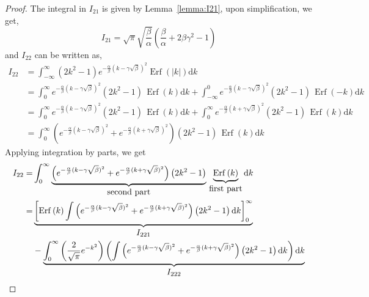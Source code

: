 \documentclass[journal]{IEEEtran}
\theoremstyle{plain}
\theoremstyle{definition}
\theoremstyle{remark}
\newcommand{\Erf}{\operatorname{Erf}}
\newcommand{\dd}{\mathrm{d}}
\begin{document}
\begin{proof}
The integral in $I_{21}$ is given by Lemma~\ref{lemma:I21}, upon simplification, we get,
\begin{equation}
    I_{21} = \sqrt{\pi} \sqrt{\frac{\beta}{\alpha}} \left(\frac{\beta}{\alpha} + 2 \beta \gamma^2 - 1 \right)
\end{equation}
and $I_{22}$ can be written as,
\begin{equation}
\begin{split}
    I_{22} &= \int_{-\infty}^\infty \left(2 k^2 - 1\right) e^{ -\frac{\alpha}{\beta} (k - \gamma\sqrt{\beta})^{2} } \Erf\left(|k|\right) \dd k \\
    &= \int_{0}^\infty e^{ -\frac{\alpha}{\beta} (k - \gamma\sqrt{\beta})^{2} } \left(2 k^2 - 1\right)\, \Erf\left(k\right) \dd k + \int_{-\infty}^0 e^{ -\frac{\alpha}{\beta} (k - \gamma\sqrt{\beta})^{2} } \left(2 k^2 - 1\right)\, \Erf\left(-k\right) \dd k \\
    &= \int_{0}^\infty e^{ -\frac{\alpha}{\beta} (k - \gamma\sqrt{\beta})^{2} } \left(2 k^2 - 1\right)\, \Erf\left(k\right) \dd k + \int_{0}^\infty e^{ -\frac{\alpha}{\beta} (k + \gamma\sqrt{\beta})^{2} } \left(2 k^2 - 1\right)\, \Erf\left(k\right) \dd k \\
    &= \int_{0}^\infty \left(e^{ -\frac{\alpha}{\beta} (k - \gamma\sqrt{\beta})^{2}} + e^{ -\frac{\alpha}{\beta} (k + \gamma\sqrt{\beta})^{2}} \right)\left(2 k^2 - 1\right)\, \Erf\left(k\right) \dd k 
\end{split}
\end{equation}
Applying integration by parts, we get
\begin{equation}
\begin{split}
    I_{22} =& \int_{0}^\infty \underbrace{\left(e^{ -\frac{\alpha}{\beta} (k - \gamma\sqrt{\beta})^{2}} + e^{ -\frac{\alpha}{\beta} (k + \gamma\sqrt{\beta})^{2}} \right)\left(2 k^2 - 1\right)}_{\text{\normalsize second part}}\, \underbrace{\Erf\left(k\right)}_{\text{\normalsize first part}} \dd k \\
    =& \underbrace{\left[\Erf\left(k\right) \int \left(e^{ -\frac{\alpha}{\beta} (k - \gamma\sqrt{\beta})^{2}} + e^{ -\frac{\alpha}{\beta} (k + \gamma\sqrt{\beta})^{2}} \right)\left(2 k^2 - 1\right) \dd k \right]_0^\infty}_{\text{\normalsize \(I_{221}\)}} \\& - \underbrace{\int_{0}^\infty \left(\frac{2}{\sqrt{\pi}} e^{-k^2}\right) \left(\int \left(e^{ -\frac{\alpha}{\beta} (k - \gamma\sqrt{\beta})^{2}} + e^{ -\frac{\alpha}{\beta} (k + \gamma\sqrt{\beta})^{2}} \right)\left(2 k^2 - 1\right) \dd k\right) \dd k}_{\text{\normalsize \(I_{222}\)}}

\end{split}
\end{equation}
\end{proof}
\end{document}
